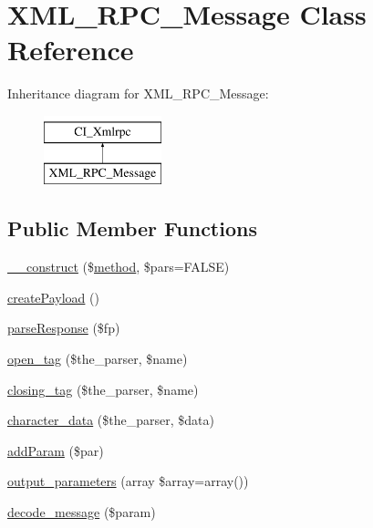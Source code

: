 \hypertarget{class_x_m_l___r_p_c___message}{}\section{X\+M\+L\+\_\+\+R\+P\+C\+\_\+\+Message Class Reference}
\label{class_x_m_l___r_p_c___message}
Inheritance diagram for X\+M\+L\+\_\+\+R\+P\+C\+\_\+\+Message\+:\begin{figure}[H]
\begin{center}
\leavevmode
\includegraphics[height=2.000000cm]{class_x_m_l___r_p_c___message}
\end{center}
\end{figure}
\subsection*{Public Member Functions}
\begin{DoxyCompactItemize}
\item 
\hyperlink{class_x_m_l___r_p_c___message_a099ea001f597681d3e5d9004923ccbcf}{\+\_\+\+\_\+construct} (\$\hyperlink{class_c_i___xmlrpc_a3d7e090549ec52eba8cf65598eefa72c}{method}, \$pars=F\+A\+L\+S\+E)
\item 
\hyperlink{class_x_m_l___r_p_c___message_a9db0a53d149ebbb907ef60a27bbc9f1c}{create\+Payload} ()
\item 
\hyperlink{class_x_m_l___r_p_c___message_ab1b93386615fce804baf236bf660a646}{parse\+Response} (\$fp)
\item 
\hyperlink{class_x_m_l___r_p_c___message_a7709ec5b6f0e3769592f8afdc23b9169}{open\+\_\+tag} (\$the\+\_\+parser, \$name)
\item 
\hyperlink{class_x_m_l___r_p_c___message_a6f0fbd9812fbf30516fa22d5743d9e89}{closing\+\_\+tag} (\$the\+\_\+parser, \$name)
\item 
\hyperlink{class_x_m_l___r_p_c___message_ae10d173fc93c23cb233ff01acb2afbe2}{character\+\_\+data} (\$the\+\_\+parser, \$data)
\item 
\hyperlink{class_x_m_l___r_p_c___message_a8000e3ae75e90052e5ee10febb9ce2d0}{add\+Param} (\$par)
\item 
\hyperlink{class_x_m_l___r_p_c___message_a763d97af7e5ff17493db7ecbd1064ba9}{output\+\_\+parameters} (array \$array=array())
\item 
\hyperlink{class_x_m_l___r_p_c___message_a76c958448d4b6569bfab9bfd2fb3dff0}{decode\+\_\+message} (\$param)
\end{DoxyCompactItemize}
